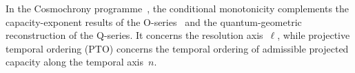 \documentclass[11pt,a4paper]{article}
\theoremstyle{plain}
\theoremstyle{definition}
\theoremstyle{remark}
\begin{document}
  In the Cosmochrony programme~\cite{Beau2026pto}, the conditional monotonicity complements
  the capacity-exponent results of the O-series~\cite{Beau2026a1note} and the
  quantum-geometric reconstruction of the Q-series.
  It concerns the resolution axis~$\ell$, while projective temporal ordering (PTO) concerns
  the temporal ordering of admissible projected capacity along the temporal axis~$n$.

  \clearpage
  
  
\end{document}
